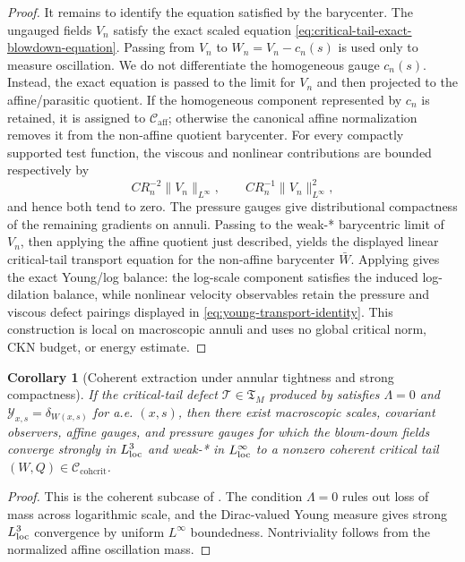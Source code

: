 \documentclass[11pt]{amsart}
\numberwithin{equation}{section}
\theoremstyle{plain}
\newtheorem{corollary}[corollary]{Corollary}
\theoremstyle{definition}
\theoremstyle{remark}
\newcommand{\Caff}{\mathcal C_{\mathrm{aff}}}
\newcommand{\Ccohcrit}{\mathcal C_{\mathrm{cohcrit}}}
\newcommand{\Tcrit}{\mathfrak T_M}
\begin{document}
\begin{proof}
It remains to identify the equation satisfied by the barycenter.  The ungauged
fields \(V_n\) satisfy the exact scaled equation
\eqref{eq:critical-tail-exact-blowdown-equation}.  Passing from \(V_n\) to
\(W_n=V_n-c_n(s)\) is used only to measure oscillation.  We do not differentiate
the homogeneous gauge \(c_n(s)\).  Instead, the exact equation is passed to the
limit for \(V_n\) and then projected to the affine/parasitic quotient.  If the
homogeneous component represented by \(c_n\) is retained, it is assigned to
\(\Caff\); otherwise the canonical affine normalization removes it from the
non-affine quotient barycenter.
For every compactly supported test function, the viscous and nonlinear
contributions are bounded respectively by
\[
   CR_n^{-2}\|V_n\|_{L^\infty},
   \qquad
   CR_n^{-1}\|V_n\|_{L^\infty}^2 ,
\]
and hence both tend to zero.  The pressure gauges give distributional
compactness of the remaining gradients on annuli.  Passing to the weak-*
barycentric limit of \(V_n\), then applying the affine quotient just described,
yields the displayed linear critical-tail transport equation for the
non-affine barycenter \(\bar W\).
Applying  gives the exact
Young/log balance: the log-scale component satisfies the induced
log-dilation balance, while nonlinear velocity observables retain the pressure and
viscous defect pairings displayed in
\eqref{eq:young-transport-identity}.  This construction is local on
macroscopic annuli and uses no global critical norm, CKN budget, or energy
estimate.
\end{proof}

\begin{corollary}[Coherent extraction under annular tightness and strong compactness]
\label{cor:coherent-critical-tail-extraction}
If the critical-tail defect \(\mathcal T\in\Tcrit\) produced by
 satisfies
\(\Lambda=0\) and
\(\mathcal Y_{x,s}=\delta_{W(x,s)}\) for a.e. \((x,s)\), then there exist
macroscopic scales, covariant observers, affine gauges, and pressure gauges for
which the blown-down fields converge strongly in \(L^3_{\rm loc}\) and weak-*
in \(L^\infty_{\rm loc}\) to a nonzero coherent critical tail
\((W,Q)\in\Ccohcrit\).
\end{corollary}

\begin{proof}
This is the coherent subcase of
.  The condition
\(\Lambda=0\) rules out loss of mass across logarithmic scale, and the
Dirac-valued Young measure gives strong \(L^3_{\rm loc}\) convergence by
uniform \(L^\infty\) boundedness.  Nontriviality follows from the normalized
affine oscillation mass.
\end{proof}
\end{document}
